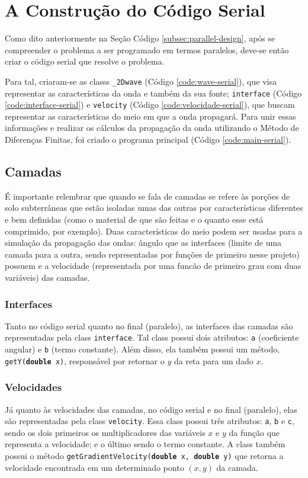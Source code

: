 \section{A Construção do Código Serial}

Como dito anteriormente na Seção Código \ref{subsec:parallel-design}, 
após se compreender o problema a ser programado em termos paralelos,
deve-se então criar o código serial que resolve o problema.

Para tal, criaram-se as \glspl{class} \texttt{\_2Dwave} (Código \ref{code:wave-serial}), que visa representar as características da 
onda e também da sua fonte; \texttt{interface} (Código \ref{code:interface-serial}) e \texttt{velocity} 
(Código \ref{code:velocidade-serial}), que buscam representar as características do meio em que a onda propagará. 
Para unir essas informações e realizar os cálculos da propagação da onda utilizando o Método de Diferenças Finitas, foi 
criado o programa principal (Código \ref{code:main-serial}).

\subsection{Camadas}
É importante relembrar que quando se fala de camadas se refere às porções de solo subterrâneas 
que estão isoladas umas das outras por características diferentes e bem definidas (como o material 
de que são feitas e o quanto esse está comprimido, por exemplo). Duas características do meio podem ser 
usadas para a simulação da propagação das ondas: ângulo que as interfaces (limite de uma camada para a outra, 
sendo representadas por funções de primeiro nesse projeto) possuem e a velocidade (representada por uma funcão de 
primeiro grau com duas variáveis) das camadas.

\subsubsection{Interfaces}
Tanto no código serial quanto no final (paralelo), as interfaces das camadas são representadas
pela \gls{class} \texttt{interface}. Tal \gls{class} possui dois atributos: \texttt{a} (coeficiente angular) e 
\texttt{b} (termo constante). Além disso, ela também possui um método, \texttt{getY(\textbf{double} x)}, responsável por retornar 
o $y$ da reta para um dado $x$.

\subsubsection{Velocidades}
Já quanto às velocidades das camadas, no código serial e no final (paralelo), elas são representadas 
pela \gls{class} \texttt{velocity}. Essa \gls{class} possui três atributos: \texttt{a}, \texttt{b} e \texttt{c}, 
sendo os dois primeiros os multiplicadores das variáveis $x$ e $y$ da função que representa a velocidade; e o último 
sendo o termo constante. A \gls{class} também possui o método \texttt{getGradientVelocity(\textbf{double} x, \textbf{double} y)} 
que retorna a velocidade encontrada em um determinado ponto $(x, y)$ da camada.

